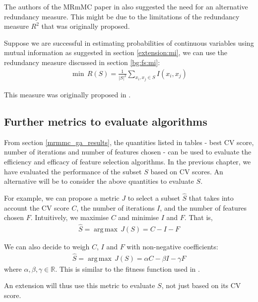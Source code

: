 \documentclass[12pt, twoside, a4paper]{report}
\DeclareMathOperator*{\argmax}{arg\,max}
\begin{document}
The authors of the MRmMC paper in \cite{RefWorks:187} also suggested the need for an alternative redundancy measure. This might be due to the limitations of the redundancy measure $R^2$ that was originally proposed.

Suppose we are successful in estimating probabilities of continuous variables using mutual information as suggested in section \ref{extension:mi}, we can use the redundancy measure discussed in section \ref{bg:fs:mi}:
\begin{align*}
\min \, R(S) = \frac{1}{|S|^2} \sum_{x_i, x_j \in S} I(x_i, x_j)
\end{align*}

This measure was originally proposed in \cite{RefWorks:182}.


\subsection{Further metrics to evaluate algorithms}

From section \ref{mrmmc_ga_results}, the quantities listed in tables - best CV score, number of iterations and number of features chosen - can be used to evaluate the efficiency and efficacy of feature selection algorithms. In the previous chapter, we have evaluated the performance of the subset $S$ based on CV scores. An alternative will be to consider the above quantities to evaluate $S$.

For example, we can propose a metric $J$ to select a subset $\widehat{S}$ that takes into account the CV score $C$, the number of iterations $I$, and the number of features chosen $F$. Intuitively, we maximise $C$ and minimise $I$ and $F$. That is,
\begin{align*}
\widehat{S} = \argmax \, J(S) = C - I - F
\end{align*}

We can also decide to weigh $C$, $I$ and $F$ with non-negative coefficients:
\begin{align*}
\widehat{S} = \argmax \, J(S) = \alpha C - \beta I - \gamma F
\end{align*}
where $\alpha, \beta, \gamma \in \mathbb{R}$. This is similar to the fitness function used in \cite{RefWorks:199}.

An extension will thus use this metric to evaluate $S$, not just based on its CV score.

\newpage

\singlespacing
{}



\end{document}
